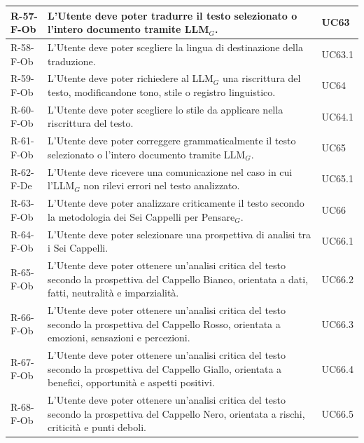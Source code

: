 \documentclass[a4paper, 10pt]{article}
\begin{document}
\begin{longtable}{|p{2.2cm}|p{7.5cm}|p{4cm}|}
R-57-F-Ob & L'Utente deve poter tradurre il testo selezionato o l'intero documento tramite LLM$_G$. & UC63 \\ \hline

R-58-F-Ob & L'Utente deve poter scegliere la lingua di destinazione della traduzione. & UC63.1 \\ \hline

R-59-F-Ob & L'Utente deve poter richiedere al LLM$_G$ una riscrittura del testo, modificandone tono, stile o registro linguistico. & UC64 \\ \hline

R-60-F-Ob & L'Utente deve poter scegliere lo stile da applicare nella riscrittura del testo. & UC64.1 \\ \hline

R-61-F-Ob & L'Utente deve poter correggere grammaticalmente il testo selezionato o l'intero documento tramite LLM$_G$. & UC65 \\ \hline

R-62-F-De & L'Utente deve ricevere una comunicazione nel caso in cui l'LLM$_G$ non rilevi errori nel testo analizzato. & UC65.1 \\ \hline

R-63-F-Ob & L'Utente deve poter analizzare criticamente il testo secondo la metodologia dei Sei Cappelli per Pensare$_G$. & UC66 \\ \hline

R-64-F-Ob & L'Utente deve poter selezionare una prospettiva di analisi tra i Sei Cappelli. & UC66.1 \\ \hline

R-65-F-Ob & L'Utente deve poter ottenere un'analisi critica del testo secondo la prospettiva del Cappello Bianco, orientata a dati, fatti, neutralità e imparzialità. & UC66.2 \\ \hline

R-66-F-Ob & L'Utente deve poter ottenere un'analisi critica del testo secondo la prospettiva del Cappello Rosso, orientata a emozioni, sensazioni e percezioni. & UC66.3 \\ \hline

R-67-F-Ob & L'Utente deve poter ottenere un'analisi critica del testo secondo la prospettiva del Cappello Giallo, orientata a benefici, opportunità e aspetti positivi. & UC66.4 \\ \hline

R-68-F-Ob & L'Utente deve poter ottenere un'analisi critica del testo secondo la prospettiva del Cappello Nero, orientata a rischi, criticità e punti deboli. & UC66.5 \\ \hline


\end{longtable}
\end{document}
